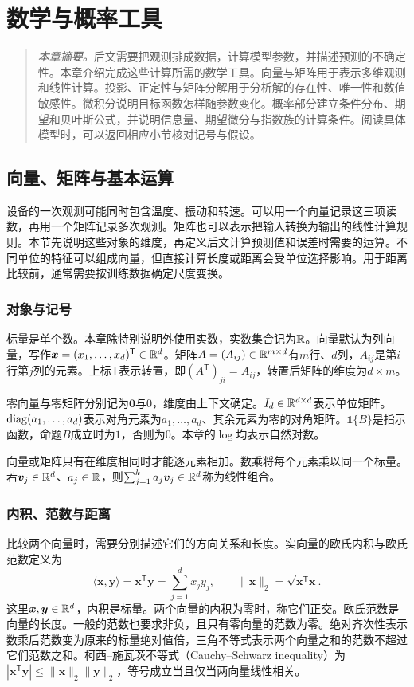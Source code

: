 ﻿\chapter{数学与概率工具}

\begin{quote}\small
\textit{本章摘要。}后文需要把观测排成数据，计算模型参数，并描述预测的不确定性。本章介绍完成这些计算所需的数学工具。向量与矩阵用于表示多维观测和线性计算。投影、正定性与矩阵分解用于分析解的存在性、唯一性和数值敏感性。微积分说明目标函数怎样随参数变化。概率部分建立条件分布、期望和贝叶斯公式，并说明信息量、期望微分与指数族的计算条件。阅读具体模型时，可以返回相应小节核对记号与假设。
\end{quote}

\section{向量、矩阵与基本运算}
设备的一次观测可能同时包含温度、振动和转速。可以用一个向量记录这三项读数，再用一个矩阵记录多次观测。矩阵也可以表示把输入转换为输出的线性计算规则。本节先说明这些对象的维度，再定义后文计算预测值和误差时需要的运算。不同单位的特征可以组成向量，但直接计算长度或距离会受单位选择影响。用于距离比较前，通常需要按训练数据确定尺度变换。

\subsection{对象与记号}
标量是单个数。本章除特别说明外使用实数，实数集合记为$\mathbb{R}$。向量默认为列向量，写作$\bm x=(x_1,\ldots,x_d)^{\mathsf T}\in\mathbb{R}^d$。矩阵$A=(A_{ij})\in\mathbb{R}^{m\times d}$有$m$行、$d$列，$A_{ij}$是第$i$行第$j$列的元素。上标$\mathsf T$表示转置，即$(A^{\mathsf T})_{ji}=A_{ij}$，转置后矩阵的维度为$d\times m$。

零向量与零矩阵分别记为$\bm0$与$0$，维度由上下文确定。$I_d\in\mathbb{R}^{d\times d}$表示单位矩阵。$\operatorname{diag}(a_1,\ldots,a_d)$表示对角元素为$a_1,\ldots,a_d$、其余元素为零的对角矩阵。$\mathbb{1}\{B\}$是指示函数，命题$B$成立时为$1$，否则为$0$。本章的$\log$均表示自然对数。

向量或矩阵只有在维度相同时才能逐元素相加。数乘将每个元素乘以同一个标量。若$\bm v_j\in\mathbb{R}^d$、$a_j\in\mathbb{R}$，则$\sum_{j=1}^k a_j\bm v_j\in\mathbb{R}^d$称为线性组合。

\subsection{内积、范数与距离}
比较两个向量时，需要分别描述它们的方向关系和长度。实向量的欧氏内积与欧氏范数定义为
\begin{equation}
 \langle\bm x,\bm y\rangle=\bm x^{\mathsf T}\bm y=\sum_{j=1}^d x_jy_j,
 \qquad \|\bm x\|_2=\sqrt{\bm x^{\mathsf T}\bm x}.
\end{equation}
这里$\bm x,\bm y\in\mathbb{R}^d$，内积是标量。两个向量的内积为零时，称它们正交。欧氏范数是向量的长度。一般的范数也要求非负，且只有零向量的范数为零。绝对齐次性表示数乘后范数变为原来的标量绝对值倍，三角不等式表示两个向量之和的范数不超过它们范数之和。柯西--施瓦茨不等式（Cauchy--Schwarz inequality）为$|\bm x^{\mathsf T}\bm y|\leq\|\bm x\|_2\|\bm y\|_2$，等号成立当且仅当两向量线性相关。

